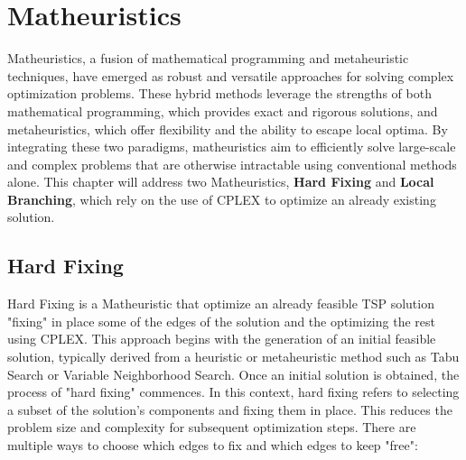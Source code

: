 \chapter{Matheuristics}
Matheuristics, a fusion of mathematical programming and metaheuristic techniques, have emerged as robust and versatile approaches for solving complex optimization problems.
These hybrid methods leverage the strengths of both mathematical programming, which provides exact and rigorous solutions, and metaheuristics, which offer flexibility and the ability to escape local optima.
By integrating these two paradigms, matheuristics aim to efficiently solve large-scale and complex problems that are otherwise intractable using conventional methods alone.
This chapter will address two Matheuristics, \textbf{Hard Fixing} and \textbf{Local Branching}, which rely on the use of CPLEX to optimize an already existing solution.

\section{Hard Fixing}
Hard Fixing is a Matheuristic that optimize an already feasible TSP solution "fixing" in place some of the edges of the solution and the optimizing the rest using CPLEX.
This approach begins with the generation of an initial feasible solution, typically derived from a heuristic or metaheuristic method such as Tabu Search or Variable Neighborhood Search.
Once an initial solution is obtained, the process of "hard fixing" commences.
In this context, hard fixing refers to selecting a subset of the solution's components and fixing them in place.
This reduces the problem size and complexity for subsequent optimization steps.
There are multiple ways to choose which edges to fix and which edges to keep "free":

